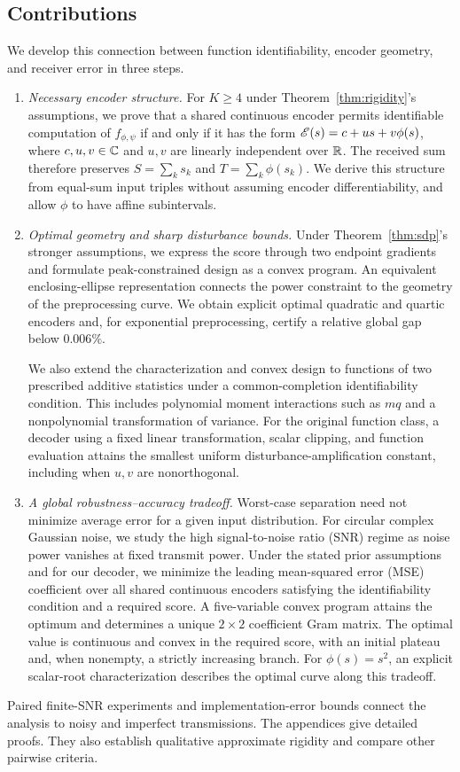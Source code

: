 \subsection{Contributions}
We develop this connection between function identifiability, encoder geometry, and receiver error in three steps.
\begin{enumerate}
\item \emph{Necessary encoder structure.} For $K\ge4$ under Theorem~\ref{thm:rigidity}'s assumptions, we prove that a shared continuous encoder permits identifiable computation of $f_{\phi,\psi}$ if and only if it has the form $\mathscr E(s)=c+us+v\phi(s)$, where $c,u,v\in\mathbb C$ and $u,v$ are linearly independent over $\mathbb R$. The received sum therefore preserves $S=\sum_k s_k$ and $T=\sum_k\phi(s_k)$. We derive this structure from equal-sum input triples without assuming encoder differentiability, and allow $\phi$ to have affine subintervals.
\item \emph{Optimal geometry and sharp disturbance bounds.} Under Theorem~\ref{thm:sdp}'s stronger assumptions, we express the score through two endpoint gradients and formulate peak-constrained design as a convex program. An equivalent enclosing-ellipse representation connects the power constraint to the geometry of the preprocessing curve. We obtain explicit optimal quadratic and quartic encoders and, for exponential preprocessing, certify a relative global gap below $0.006\%$.

We also extend the characterization and convex design to functions of two prescribed additive statistics under a common-completion identifiability condition. This includes polynomial moment interactions such as $mq$ and a nonpolynomial transformation of variance. For the original function class, a decoder using a fixed linear transformation, scalar clipping, and function evaluation attains the smallest uniform disturbance-amplification constant, including when $u,v$ are nonorthogonal.
\item \emph{A global robustness--accuracy tradeoff.} Worst-case separation need not minimize average error for a given input distribution. For circular complex Gaussian noise, we study the high signal-to-noise ratio (SNR) regime as noise power vanishes at fixed transmit power. Under the stated prior assumptions and for our decoder, we minimize the leading mean-squared error (MSE) coefficient over all shared continuous encoders satisfying the identifiability condition and a required score. A five-variable convex program attains the optimum and determines a unique $2\times2$ coefficient Gram matrix. The optimal value is continuous and convex in the required score, with an initial plateau and, when nonempty, a strictly increasing branch. For $\phi(s)=s^2$, an explicit scalar-root characterization describes the optimal curve along this tradeoff.
\end{enumerate}
Paired finite-SNR experiments and implementation-error bounds connect the analysis to noisy and imperfect transmissions. The appendices give detailed proofs.\ifArxivVersion{} They also establish qualitative approximate rigidity and compare other pairwise criteria.\fi

